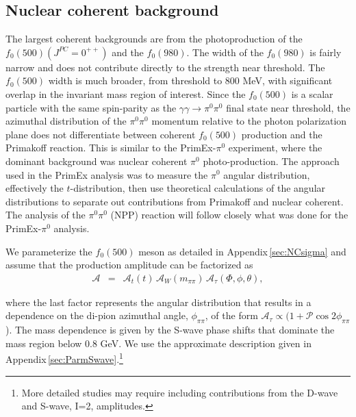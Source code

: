 \subsection{Nuclear coherent background \label{sec:NCback}}
   
The largest coherent backgrounds are  
from the photoproduction of the $f_0(500)(J^{PC}=0^{++})$ and the $f_0(980)$.
The width of the
$f_0(980)$ is fairly narrow and does not contribute directly to the strength
near threshold.
The $f_0(500)$ width is much
broader, from threshold to 800 MeV, with significant overlap in the
invariant mass region of interest.  Since the $f_0(500)$ is a scalar
particle with the same spin-parity as the $\gamma \gamma \rightarrow
\pi^0\pi^0$ final state near threshold, the azimuthal distribution of the
$\pi^0\pi^0$ momentum relative to the
photon polarization plane does not differentiate between coherent
$f_0(500)$ production and the Primakoff reaction.  
This is similar to the PrimEx-$\pi^0$ experiment, where the dominant background
was
nuclear coherent $\pi^0$ photo-production.  The approach used in the
PrimEx analysis was to measure the $\pi^0$ angular distribution,
effectively the $t$-distribution, then use theoretical calculations of
the angular distributions to separate out contributions from Primakoff
and nuclear coherent. The analysis of the $\pi^0\pi^0$ (NPP) reaction
will follow closely what was done for the PrimEx-$\pi^0$
analysis.  

We parameterize the $f_{0}(500)$ meson as detailed in
Appendix\,\ref{sec:NCsigma} and assume that the production amplitude
can be factorized as
\begin{eqnarray}
\mathcal{A} & = & \mathcal{A}_t(t) \, \mathcal{A}_W(m_{\pi\pi}) \, \mathcal{A}_\tau(\Phi, \phi, \theta),
\end{eqnarray}

where the last factor represents the angular distribution that results
in a dependence on the di-pion azimuthal angle, $\phi_{\pi\pi}$, of
the form $\mathcal{A}_\tau \propto (1 + \mathcal{P}
\cos{2\phi_{\pi\pi}}$).  The mass dependence is given by the S-wave
phase shifts that dominate the mass region below 0.8 GeV. We use the
approximate description given in
Appendix\,\ref{sec:ParmSwave}.\footnote{More detailed studies may
  require including contributions from the D-wave and S-wave, I=2,
  amplitudes.}

